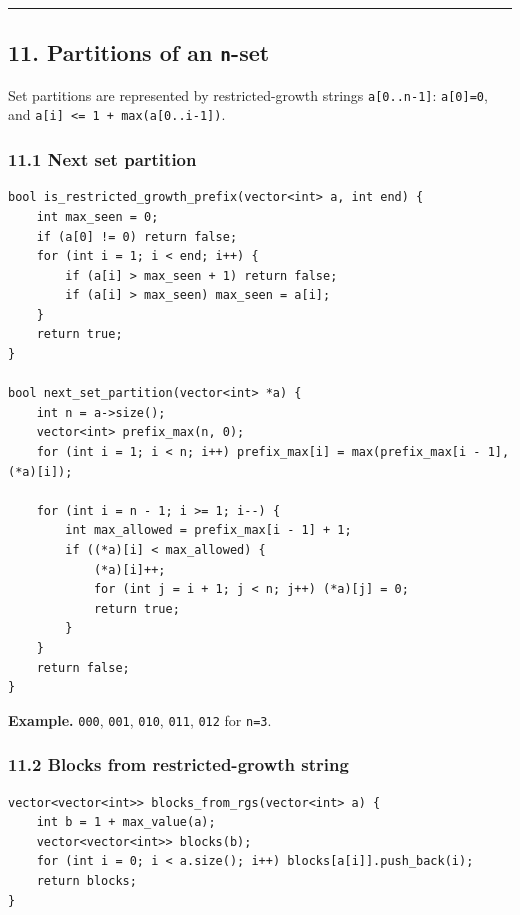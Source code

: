 \documentclass[11pt]{article}
\begin{document}
\begin{center}\rule{0.5\linewidth}{0.5pt}\end{center}

\subsection{\texorpdfstring{11. Partitions of an \texttt{n}-set}{11. Partitions of an n-set}}\label{partitions-of-an-n-set}

Set partitions are represented by restricted-growth strings \texttt{a[0..n-1]}: \texttt{a[0]=0}, and \texttt{a[i] <= 1 + max(a[0..i-1])}.

\subsubsection{11.1 Next set partition}\label{next-set-partition}

\begin{verbatim}
bool is_restricted_growth_prefix(vector<int> a, int end) {
    int max_seen = 0;
    if (a[0] != 0) return false;
    for (int i = 1; i < end; i++) {
        if (a[i] > max_seen + 1) return false;
        if (a[i] > max_seen) max_seen = a[i];
    }
    return true;
}

bool next_set_partition(vector<int> *a) {
    int n = a->size();
    vector<int> prefix_max(n, 0);
    for (int i = 1; i < n; i++) prefix_max[i] = max(prefix_max[i - 1], (*a)[i]);

    for (int i = n - 1; i >= 1; i--) {
        int max_allowed = prefix_max[i - 1] + 1;
        if ((*a)[i] < max_allowed) {
            (*a)[i]++;
            for (int j = i + 1; j < n; j++) (*a)[j] = 0;
            return true;
        }
    }
    return false;
}
\end{verbatim}

\textbf{Example.} \texttt{000}, \texttt{001}, \texttt{010}, \texttt{011}, \texttt{012} for \texttt{n=3}.

\subsubsection{11.2 Blocks from restricted-growth string}\label{blocks-from-restricted-growth-string}

\begin{verbatim}
vector<vector<int>> blocks_from_rgs(vector<int> a) {
    int b = 1 + max_value(a);
    vector<vector<int>> blocks(b);
    for (int i = 0; i < a.size(); i++) blocks[a[i]].push_back(i);
    return blocks;
}
\end{verbatim}
\end{document}
